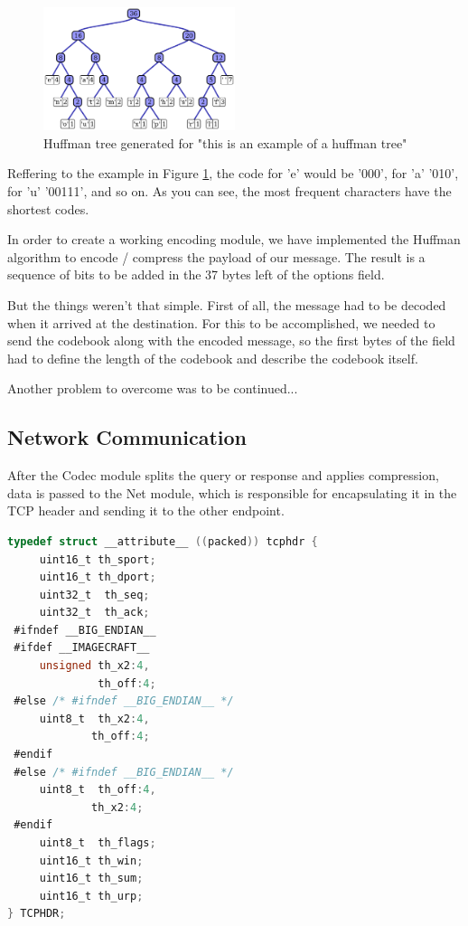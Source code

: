 \begin{figure}
  \centering
  \includegraphics[width=0.5\textwidth]{img/huffman}
  \caption{Huffman tree generated for "this is an example of a huffman tree"}
  \label{fig:huffman}
\end{figure}

Reffering to the example in Figure \ref{fig:huffman}, the code for 'e' would
be '000', for 'a' '010', for 'u' '00111', and so on. As you can see, the most
frequent characters have the shortest codes.

In order to create a working encoding module, we have implemented the Huffman
algorithm to encode / compress the payload of our message. The result is a
sequence of bits to be added in the 37 bytes left of the options field.

But the things weren't that simple. First of all, the message had to be decoded
when it arrived at the destination. For this to be accomplished, we needed to
send the codebook along with the encoded message, so the first bytes of the
field had to define the length of the codebook and describe the codebook itself.

Another problem to overcome was to be continued...

\subsection{Network Communication}

After the Codec module splits the query or response and applies compression,
data is passed to the Net module, which is responsible for encapsulating it in
the TCP header and sending it to the other endpoint.

\begin{lstlisting}[caption={Default TCP Header Structure},
                   label={lst:def-tcphdr},
                   basicstyle=\footnotesize,
                   captionpos=b,
                   frame=single,
                   language=C
                  ]
typedef struct __attribute__ ((packed)) tcphdr {
     uint16_t th_sport;
     uint16_t th_dport;
     uint32_t  th_seq;
     uint32_t  th_ack;
 #ifndef __BIG_ENDIAN__
 #ifdef __IMAGECRAFT__
     unsigned th_x2:4,
              th_off:4;
 #else /* #ifndef __BIG_ENDIAN__ */
     uint8_t  th_x2:4,
             th_off:4;
 #endif
 #else /* #ifndef __BIG_ENDIAN__ */
     uint8_t  th_off:4,
             th_x2:4;
 #endif
     uint8_t  th_flags;
     uint16_t th_win;
     uint16_t th_sum;
     uint16_t th_urp;
} TCPHDR;
\end{lstlisting}

